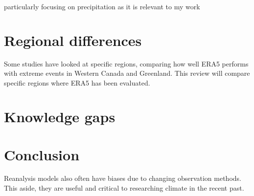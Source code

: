 \documentclass[12pt, oneside]{article}
\begin{document}
particularly focusing on precipitation as it is relevant to my work
\section{Regional differences}
Some studies have looked at specific regions, comparing how well ERA5 performs with extreme events \cite{loeb2022extreme} in Western Canada and Greenland. This review will compare specific regions where ERA5 has been evaluated.


\section{Knowledge gaps}


\section{Conclusion}

Reanalysis models also often have biases due to changing observation methods. This aside, they are useful and critical to researching climate in the recent past. 




 {}

\end{document}
